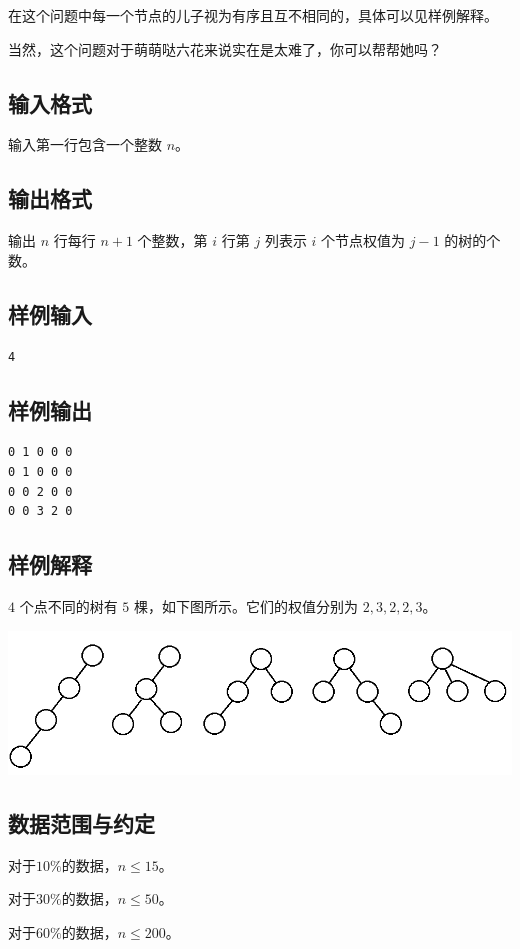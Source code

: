 \documentclass[11pt, a4paper]{article}
\begin{document}
在这个问题中每一个节点的儿子视为有序且互不相同的，具体可以见样例解释。
 
当然，这个问题对于萌萌哒六花来说实在是太难了，你可以帮帮她吗？
\subsection{输入格式}
输入第一行包含一个整数 $n$。

\subsection{输出格式}
输出 $n$ 行每行 $n+1$ 个整数，第 $i$ 行第 $j$ 列表示 $i$ 个节点权值为 $j-1$ 的树的个数。

\subsection{样例输入}
\begin{verbatim}
4
\end{verbatim}
\subsection{样例输出}
\begin{verbatim}
0 1 0 0 0
0 1 0 0 0
0 0 2 0 0
0 0 3 2 0
\end{verbatim}

\subsection{样例解释}
$4$ 个点不同的树有 $5$ 棵，如下图所示。它们的权值分别为 $2,3,2,2,3$。
\begin{center}
\includegraphics[width=0.9\linewidth]{2.png}
\end{center}
\subsection{数据范围与约定}

对于$10\%$的数据，$n \leq 15$。

对于$30\%$的数据，$n \leq 50$。

对于$60\%$的数据，$n \leq 200$。
\end{document}
